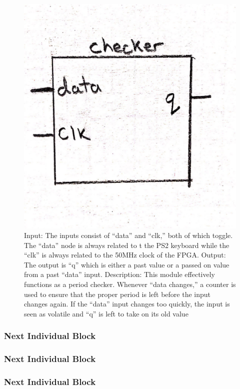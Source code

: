 \documentclass[a4paper]{article}
\begin{document}
\begin{figure}[H]
  \centering
    \includegraphics[width=.85\textwidth]{images/block_diagrams/PS2/checker.jpg}
	\caption{Input: The inputs consist of “data” and “clk,” both of which toggle. The “data” node is always related to t the PS2 keyboard while the “clk” is always related to the 50MHz clock of the FPGA.
Output: The output is “q” which is either a past value or a passed on value from a past “data” input.
Description: This module effectively functions as a period checker. Whenever “data changes,” a counter is used to ensure that the proper period is left before the input changes again. If the “data” input changes too quickly, the input is seen as volatile and “q” is left to take on its old value}
    \label{fig:counter}
\end{figure}

\subsubsection{Next Individual Block}
\subsubsection{Next Individual Block}
\subsubsection{Next Individual Block}
\end{document}
